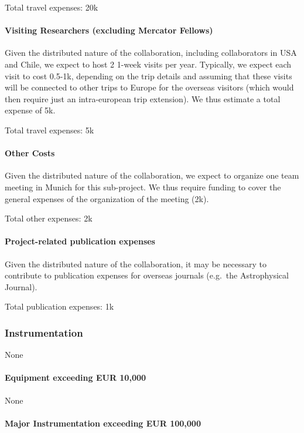 \documentclass[10pt,fleqn,twoside]{article}
\begin{document}
Total travel expenses: 20k\EUR{}


\paragraph{Visiting Researchers (excluding Mercator Fellows)}

Given the distributed nature of the collaboration, including collaborators in USA and Chile, we expect to host 2 1-week visits per year. Typically, we expect each visit to cost 0.5-1k\EUR{}, depending on the trip details and assuming that these visits will be connected to other trips to Europe for the overseas visitors (which would then require just an intra-european trip extension). We thus estimate a total expense of 5k\EUR{}.
\smallskip

Total travel expenses: 5k\EUR{}

\paragraph{Other Costs}

Given the distributed nature of the collaboration, we expect to organize one team meeting in 
Munich for this sub-project. We thus require funding to cover the general expenses of the 
organization of the meeting (2k\EUR{}).\smallskip
 

Total other expenses: 2k\EUR{}

\paragraph{Project-related publication expenses}

Given the distributed nature of the collaboration, it may be necessary to contribute to publication expenses for overseas journals (e.g.\ the Astrophysical Journal). \smallskip

Total publication expenses: 1k\EUR{}

\subsubsection{Instrumentation}

None

\paragraph{Equipment exceeding EUR 10,000} 

None

\paragraph{Major Instrumentation exceeding EUR 100,000} 
\end{document}
